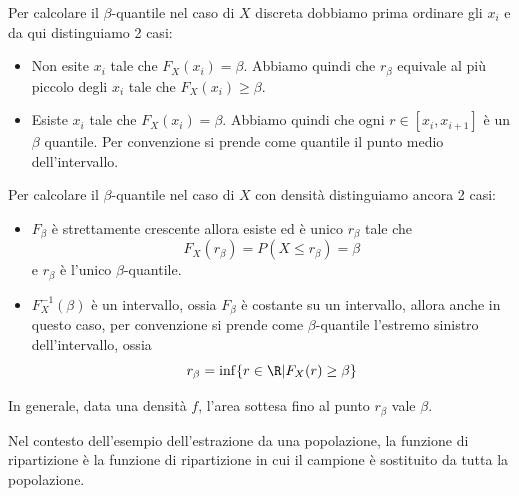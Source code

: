 Per calcolare il $\beta$-quantile nel caso di $X$ discreta dobbiamo prima ordinare gli $x_i$ e da
qui distinguiamo 2 casi:
\begin{itemize}
	\item Non esite $x_i$ tale che $F_X(x_i) = \beta$. Abbiamo quindi che $r_\beta$ equivale al più
	      piccolo degli $x_i$ tale che $F_X(x_i) \geq \beta$.
	\item Esiste $x_i$ tale che $F_X(x_i) = \beta$. Abbiamo quindi che ogni $r \in [x_i, x_{i+1}]$
	      è un $\beta$ quantile. Per convenzione si prende come quantile il punto medio
	      dell'intervallo.
\end{itemize}
Per calcolare il $\beta$-quantile nel caso di $X$ con densità distinguiamo ancora 2 casi:
\begin{itemize}
	\item $F_\beta$ è strettamente crescente allora esiste ed è unico $r_\beta$ tale che
	      \[ F_X(r_\beta) = P(X \leq r_\beta) = \beta \]
	      e $r_\beta$ è l'unico $\beta$-quantile.
	\item $F_X^{-1} (\beta)$ è un intervallo, ossia $F_\beta$ è costante su un intervallo, allora
	      anche in questo caso, per convenzione si prende come $\beta$-quantile l'estremo sinistro
	      dell'intervallo, ossia
	      \[ r_\beta = \inf \{ r \in \R | F_X(r) \geq \beta \} \]
\end{itemize}
In generale, data una densità $f$, l'area sottesa fino al punto $r_\beta$ vale $\beta$.

\begin{observation}
	Nel contesto dell'esempio dell'estrazione da una popolazione, la funzione di ripartizione è la
	funzione di ripartizione in cui il campione è sostituito da tutta la popolazione.
\end{observation}
